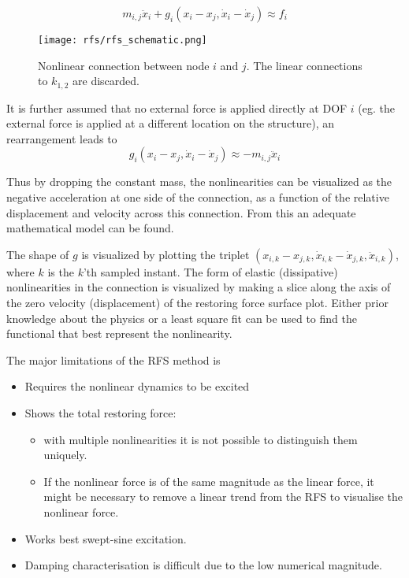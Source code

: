 \begin{equation}
  \label{eq:rfs_newton2}
  m_{i,j} \ddot x_i +  g_i (x_i - x_j , \dot x_i - \dot x_j) \approx f_i
\end{equation}

\begin{figure}[ht!]
  \centering
  \texttt{[image: rfs/rfs\_schematic.png]}
  \caption{Nonlinear connection between node $i$ and $j$. The linear connections
    to $k_{1,2}$ are discarded.}
  \label{fig:rfs_schematic}
\end{figure}

It is further assumed that no external force is applied directly at DOF $i$
(eg. the external force is applied at a different location on the structure), an
rearrangement leads to
\begin{equation}
  \label{eq:rfs}
  g_i (x_i - x_j , \dot x_i - \dot x_j) \approx -m_{i,j} \ddot x_i
\end{equation}

Thus by dropping the constant mass, the nonlinearities can be visualized as the
negative acceleration at one side of the connection, as a function of the
relative displacement and velocity across this connection. From this an adequate
mathematical model can be found.

The shape of $g$ is visualized by plotting the triplet
$(x_{i,k} - x_{j,k}, \dot x_{i,k} - \dot x_{j,k}, \ddot x_{i,k})$, where $k$
is the  $k$'th sampled instant.
The form of elastic (dissipative) nonlinearities in the connection is visualized
by making a slice along the axis of the zero velocity (displacement) of the
restoring force surface plot.
Either prior knowledge about the physics or a least square fit can be
used to find the functional that best represent the nonlinearity.



The major limitations of the RFS method is
\begin{itemize}
\item Requires the nonlinear dynamics to be excited
\item Shows the total restoring force:
  \begin{itemize}
  \item with multiple nonlinearities it is not possible to distinguish them
    uniquely.
  \item If the nonlinear force is of the same magnitude as the linear force, it
    might be necessary to remove a linear trend from the RFS to visualise the
    nonlinear force.
  \end{itemize}
\item Works best swept-sine excitation.
\item Damping characterisation is difficult due to the low numerical magnitude.
\end{itemize}


